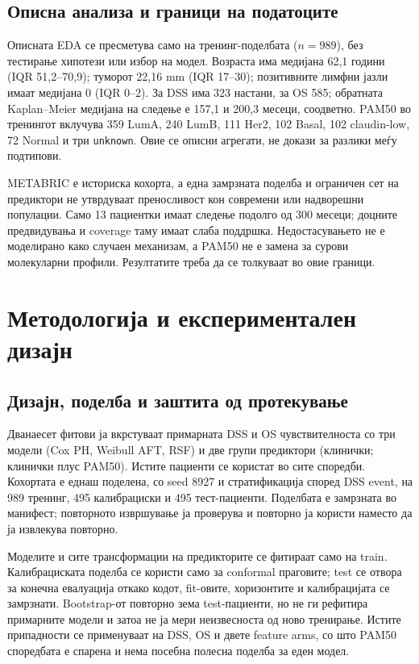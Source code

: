 \documentclass[12pt]{article}
\begin{document}
\subsection{Описна анализа и граници на податоците}

Описната EDA се пресметува само на тренинг-поделбата ($n=989$), без тестирање
хипотези или избор на модел. Возраста има медијана 62,1 години (IQR 51,2--70,9);
туморот 22,16 mm (IQR 17--30); позитивните лимфни јазли имаат медијана 0
(IQR 0--2). За DSS има 323 настани, за OS 585; обратната Kaplan--Meier медијана
на следење е 157,1 и 200,3 месеци, соодветно. PAM50 во тренингот вклучува 359
LumA, 240 LumB, 111 Her2, 102 Basal, 102 claudin-low, 72 Normal и три
\texttt{unknown}. Овие се описни агрегати, не докази за разлики меѓу подтипови.

METABRIC е историска кохорта, а една замрзната поделба и ограничен сет на
предиктори не утврдуваат преносливост кон современи или надворешни популации.
Само 13 пациентки имаат следење подолго од 300 месеци; доцните
предвидувања и coverage таму имаат слаба поддршка. Недостасувањето не е
моделирано како случаен механизам, а PAM50 не е замена за сурови молекуларни
профили. Резултатите треба да се толкуваат во овие граници.

\section{Методологија и експериментален дизајн}

\subsection{Дизајн, поделба и заштита од протекување}

Дванаесет фитови ја вкрстуваат примарната DSS и OS чувствителноста со три
модели (Cox PH, Weibull AFT, RSF) и две групи предиктори (клинички; клинички
плус PAM50). Истите пациенти се користат во сите споредби. Кохортата е еднаш
поделена, со seed 8927 и стратификација според DSS event, на 989 тренинг, 495
калибрациски и 495 тест-пациенти. Поделбата е замрзната во манифест; повторното
извршување ја проверува и повторно ја користи наместо да ја извлекува повторно.

Моделите и сите трансформации на предикторите се фитираат само на train.
Калибрациската поделба се користи само за conformal праговите; test се отвора
за конечна евалуација откако кодот, fit-овите, хоризонтите и калибрацијата се
замрзнати. Bootstrap-от повторно зема test-пациенти, но не ги рефитира
примарните модели и затоа не ја мери неизвесноста од ново тренирање. Истите
припадности се применуваат на DSS, OS и двете feature arms, со што PAM50
споредбата е спарена и нема посебна полесна поделба за еден модел.
\end{document}
